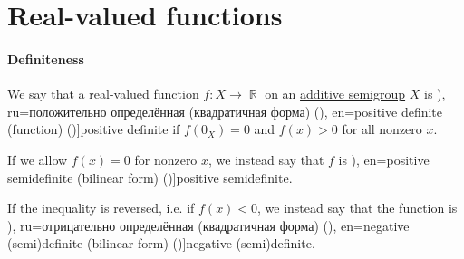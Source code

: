 \section{Real-valued functions}\label{sec:real_valued_functions}

\paragraph{Definiteness}

\begin{definition}\label{def:real_function_definiteness}\mimprovised
  We say that a real-valued function \( f: X \to \BbbR \) on an \hyperref[def:additive_semigroup]{additive semigroup} \( X \) is \term[bg=положително положително дефинитна (квадратична форма) (\cite[86]{Обрешков1962ВисшаАлгебра}), ru=положительно определённая (квадратичная форма) (\cite[def. 1.4.7]{Кострикин2020АлгебраЧасть2}), en=positive definite (function) (\cite[17; 271]{Clarke2013OptimalControl})]{positive definite} if \( f(0_X) = 0 \) and \( f(x) > 0 \) for all nonzero \( x \).

  If we allow \( f(x) = 0 \) for nonzero \( x \), we instead say that \( f \) is \term[ru=положительно полуопрделённая (квадратичная форма) (\cite[def. 1.4.7]{Кострикин2020АлгебраЧасть2}), en=positive semidefinite (bilinear form) (\cite[107]{Knapp2016BasicAlgebra})]{positive semidefinite}.

  If the inequality is reversed, i.e. if \( f(x) < 0 \), we instead say that the function is \term[bg=отрицателно дефинитна (квадратична форма) (\cite[86]{Обрешков1962ВисшаАлгебра}), ru=отрицательно определённая (квадратичная форма) (\cite[def. 1.4.7]{Кострикин2020АлгебраЧасть2}), en=negative (semi)definite (bilinear form) (\cite[107]{Knapp2016BasicAlgebra})]{negative (semi)definite}.
\end{definition}


